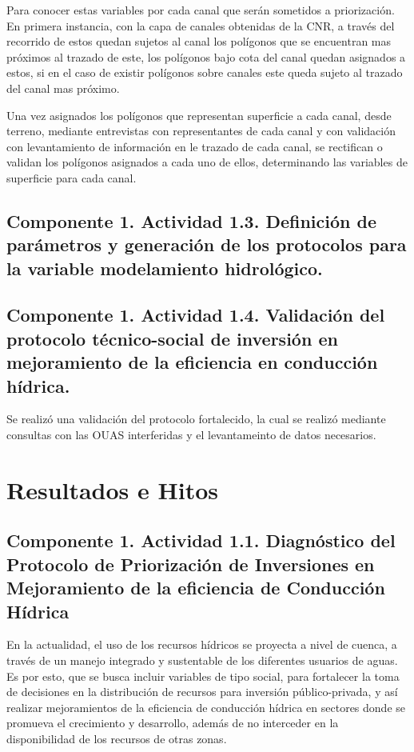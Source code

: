 \documentclass[]{article}
\begin{document}
Para conocer estas variables por cada canal que serán sometidos a priorización. En primera instancia, con la capa de canales obtenidas de la CNR, a través del recorrido de estos quedan sujetos al canal los polígonos que se encuentran mas próximos al trazado de este, los polígonos bajo cota del canal quedan asignados a estos, si en el caso de existir polígonos sobre canales este queda sujeto al trazado del canal mas próximo.

Una vez asignados los polígonos que representan superficie a cada canal, desde terreno, mediante entrevistas con representantes de cada canal y con validación con levantamiento de información en le trazado de cada canal, se rectifican o validan los polígonos asignados a cada uno de ellos, determinando las variables de superficie para cada canal.


\subsection{Componente 1. Actividad 1.3. Definición de parámetros y generación de los protocolos para la variable modelamiento hidrológico.}


\subsection{Componente 1. Actividad 1.4. Validación del protocolo técnico-social de inversión en mejoramiento de la eficiencia en conducción hídrica.}

Se realizó una validación del protocolo fortalecido, la cual se realizó mediante consultas con las OUAS interferidas y el levantameinto de datos necesarios.


\clearpage
\section{Resultados e Hitos}

\subsection{Componente 1. Actividad 1.1. Diagnóstico del Protocolo de Priorización de Inversiones en Mejoramiento de la eficiencia de Conducción Hídrica}

En la actualidad, el uso de los recursos hídricos se proyecta a nivel de cuenca, a través de un manejo integrado y sustentable de los diferentes usuarios de aguas. Es por esto, que se busca incluir variables de tipo social, para fortalecer la toma de decisiones en la distribución de recursos para inversión público-privada, y así realizar mejoramientos de la eficiencia de conducción hídrica en sectores donde se promueva el crecimiento y desarrollo, además de no interceder en la disponibilidad de los recursos de otras zonas.\\
\end{document}
